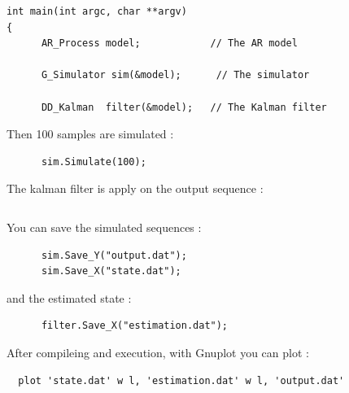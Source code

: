  

\begin{DocInclude}\begin{verbatim}int main(int argc, char **argv)
{
      AR_Process model;            // The AR model

      G_Simulator sim(&model);      // The simulator
      
      DD_Kalman  filter(&model);   // The Kalman filter 
\end{verbatim}
\end{DocInclude}


Then 100 samples are simulated : 

\begin{DocInclude}\begin{verbatim}      sim.Simulate(100);
\end{verbatim}
\end{DocInclude}
 The kalman filter is apply on the output sequence : 

\begin{DocInclude}\begin{verbatim}\end{verbatim}
\end{DocInclude}
 You can save the simulated sequences : 

\begin{DocInclude}\begin{verbatim}      sim.Save_Y("output.dat");
      sim.Save_X("state.dat");
\end{verbatim}
\end{DocInclude}


and the estimated state : 

\begin{DocInclude}\begin{verbatim}      filter.Save_X("estimation.dat");
\end{verbatim}
\end{DocInclude}


After compileing and execution, with Gnuplot you can plot : 

\begin{Code}\begin{verbatim}  plot 'state.dat' w l, 'estimation.dat' w l, 'output.dat'
\end{verbatim}
\end{Code}

